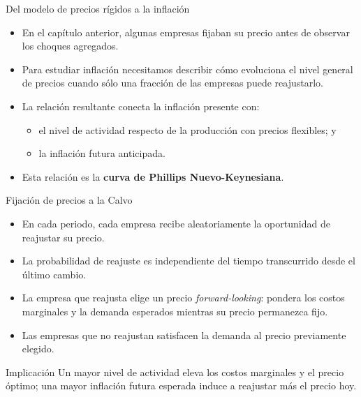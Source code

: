 \documentclass[aspectratio=169,11pt]{beamer}
\newcommand{\cidehighlight}[1]{\textcolor{CIDEBlue}{\bfseries #1}}
\begin{document}
\begin{frame}{Del modelo de precios rígidos a la inflación}
  \begin{itemize}
    \setlength{\itemsep}{0.62em}
    \item En el capítulo anterior, algunas empresas fijaban su precio antes de observar los choques agregados.
    \item Para estudiar inflación necesitamos describir cómo evoluciona el nivel general de precios cuando sólo una fracción de las empresas puede reajustarlo.
    \item La relación resultante conecta la inflación presente con:
    \begin{itemize}
      \item el nivel de actividad respecto de la producción con precios flexibles; y
      \item la inflación futura anticipada.
    \end{itemize}
    \item Esta relación es la \cidehighlight{curva de Phillips Nuevo-Keynesiana}.
  \end{itemize}
\end{frame}

\begin{frame}{Fijación de precios a la Calvo}
  \begin{itemize}
    \setlength{\itemsep}{0.58em}
    \item En cada periodo, cada empresa recibe aleatoriamente la oportunidad de reajustar su precio.
    \item La probabilidad de reajuste es independiente del tiempo transcurrido desde el último cambio.
    \item La empresa que reajusta elige un precio \textit{forward-looking}: pondera los costos marginales y la demanda esperados mientras su precio permanezca fijo.
    \item Las empresas que no reajustan satisfacen la demanda al precio previamente elegido.
  \end{itemize}

  \begin{block}{Implicación}
    Un mayor nivel de actividad eleva los costos marginales y el precio óptimo; una mayor inflación futura esperada induce a reajustar más el precio hoy.
  \end{block}
\end{frame}
\end{document}
